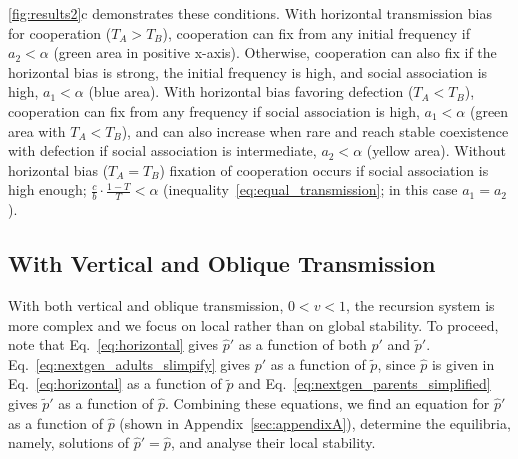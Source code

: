 \documentclass[12pt]{extarticle}
\begin{document}
{\autoref{fig:results2}c demonstrates these conditions.
With horizontal transmission bias for cooperation ($T_A>T_B$), cooperation can fix from any initial frequency if $a_2<\alpha$ (green area in positive x-axis). 
Otherwise, cooperation can also fix if the horizontal bias is strong, the initial frequency is high, and social association is high, $a_1 < \alpha$ (blue area).
With horizontal bias favoring defection ($T_A<T_B$), cooperation can fix from any frequency if social association is high, $a_1<\alpha$ (green area with $T_A<T_B$), and can also increase when rare and reach stable coexistence with defection if social association is intermediate, $a_2<\alpha$ (yellow area).
Without horizontal bias ($T_A=T_B$) fixation of cooperation occurs if social association is high enough; $\frac{c}{b} \cdot \frac{1-T}{T} < \alpha$ (inequality~\ref{eq:equal_transmission}; in this case $a_1=a_2$).



\subsection*{With Vertical and Oblique Transmission}

With both vertical and oblique transmission, $0<v<1$, the recursion system is more complex
and we focus on local rather than on global stability.
To proceed,  note that 
Eq.\ \ref{eq:horizontal} gives $\hat{p}'$ as a function of both $p'$ and $\tilde{p}'$.
Eq.\ \ref{eq:nextgen_adults_slimpify} gives $p'$ as a function of $\tilde{p}$, since $\hat{p}$ is given in Eq.\ \ref{eq:horizontal} as a function of $\tilde{p}$ and 
Eq.\ \ref{eq:nextgen_parents_simplified} gives $\tilde{p}'$ as a function of $\hat{p}$. 
Combining these equations, we find an equation for $\hat{p}'$ as a function of $\hat{p}$ (shown in Appendix~\autoref{sec:appendixA}),
determine the equilibria, namely, solutions of $\hat{p}' = \hat{p}$, and analyse their local stability.

}
\end{document}
